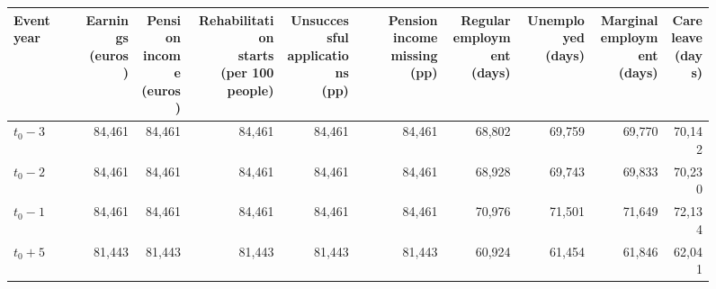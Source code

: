 \documentclass[a4paper,12pt]{article}
\theoremstyle{plain}
\theoremstyle{definition}
\theoremstyle{TheoremNum}
\theoremstyle{CorollaryNum}
\theoremstyle{PropositionNum}
\theoremstyle{TheoremNum}
\begin{document}
\begin{figure}[H]
\begin{minipage}{\textwidth}
        \par\smallskip
        {\centering
        \setlength{\tabcolsep}{2pt}
        \begin{adjustbox}{max width=\linewidth}
            \begin{tabular}{@{}lrrrrrrrrr@{}}
                \toprule
                Event year
                & \shortstack[r]{Earnings\\(euros)}
                & \shortstack[r]{Pension\\income\\(euros)}
                & \shortstack[r]{Rehabilitation\\starts\\(per 100 people)}
                & \shortstack[r]{Unsuccessful\\applications\\(pp)}
                & \shortstack[r]{Pension income\\missing\\(pp)}
                & \shortstack[r]{Regular\\employment\\(days)}
                & \shortstack[r]{Unemployed\\(days)}
                & \shortstack[r]{Marginal\\employment\\(days)}
                & \shortstack[r]{Care\\leave\\(days)} \\
                \midrule
                $t_0-3$ & 84,461 & 84,461 & 84,461 & 84,461 & 84,461
                        & 68,802 & 69,759 & 69,770 & 70,142 \\
                $t_0-2$ & 84,461 & 84,461 & 84,461 & 84,461 & 84,461
                        & 68,928 & 69,743 & 69,833 & 70,230 \\
                $t_0-1$ & 84,461 & 84,461 & 84,461 & 84,461 & 84,461
                        & 70,976 & 71,501 & 71,649 & 72,134 \\
                $t_0+5$ & 81,443 & 81,443 & 81,443 & 81,443 & 81,443
                        & 60,924 & 61,454 & 61,846 & 62,041 \\
                \bottomrule
            \end{tabular}
        \end{adjustbox}
        \par}
    \end{minipage}
\end{figure}
\end{document}
